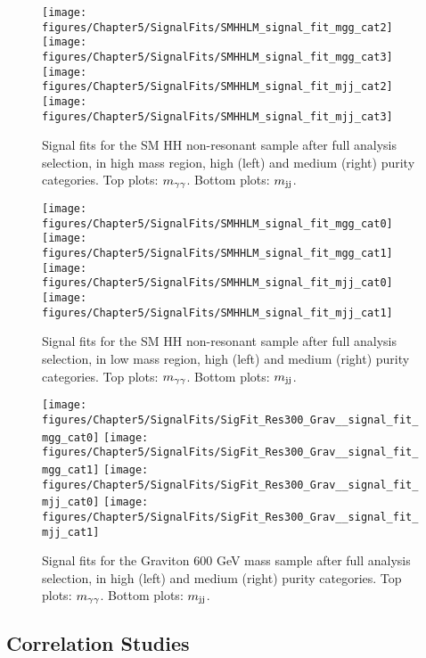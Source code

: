 \begin{figure*}[h]
  \centering
  \texttt{[image: figures/Chapter5/SignalFits/SMHHLM\_signal\_fit\_mgg\_cat2]}\hfil
  \texttt{[image: figures/Chapter5/SignalFits/SMHHLM\_signal\_fit\_mgg\_cat3]}\hfil
  \texttt{[image: figures/Chapter5/SignalFits/SMHHLM\_signal\_fit\_mjj\_cat2]}\hfil
  \texttt{[image: figures/Chapter5/SignalFits/SMHHLM\_signal\_fit\_mjj\_cat3]}\hfil
  \caption{Signal fits for the SM HH non-resonant sample after full analysis selection, in high mass region, high (left) and medium (right) purity categories. Top plots: $m_{\gamma\gamma}$. Bottom plots: $m_{\rm jj}$.}
  \label{fig:sig_highmassSM}
\end{figure*}

\begin{figure*}[h]
  \centering
  \texttt{[image: figures/Chapter5/SignalFits/SMHHLM\_signal\_fit\_mgg\_cat0]}\hfil
  \texttt{[image: figures/Chapter5/SignalFits/SMHHLM\_signal\_fit\_mgg\_cat1]}\hfil
  \texttt{[image: figures/Chapter5/SignalFits/SMHHLM\_signal\_fit\_mjj\_cat0]}\hfil
  \texttt{[image: figures/Chapter5/SignalFits/SMHHLM\_signal\_fit\_mjj\_cat1]}\hfil
  \caption{Signal fits for the SM HH non-resonant sample after full analysis selection, in low mass region, high (left) and medium (right) purity categories. Top plots: $m_{\gamma\gamma}$. Bottom plots: $m_{\rm jj}$.}
  \label{fig:sig_lowmassSM}
\end{figure*}


\begin{figure*}[h]
  \centering
  \texttt{[image: figures/Chapter5/SignalFits/SigFit\_Res300\_Grav\_\_signal\_fit\_mgg\_cat0]}\hfil
  \texttt{[image: figures/Chapter5/SignalFits/SigFit\_Res300\_Grav\_\_signal\_fit\_mgg\_cat1]}\hfil
  \texttt{[image: figures/Chapter5/SignalFits/SigFit\_Res300\_Grav\_\_signal\_fit\_mjj\_cat0]}\hfil
  \texttt{[image: figures/Chapter5/SignalFits/SigFit\_Res300\_Grav\_\_signal\_fit\_mjj\_cat1]}\hfil
  \caption{Signal fits for the Graviton 600 GeV mass sample after full analysis selection, in high (left) and medium (right) purity categories. Top plots: $m_{\gamma\gamma}$. Bottom plots: $m_{\rm jj}$.}
  \label{fig:sig_rad600}
\end{figure*}

\subsection{Correlation Studies}

